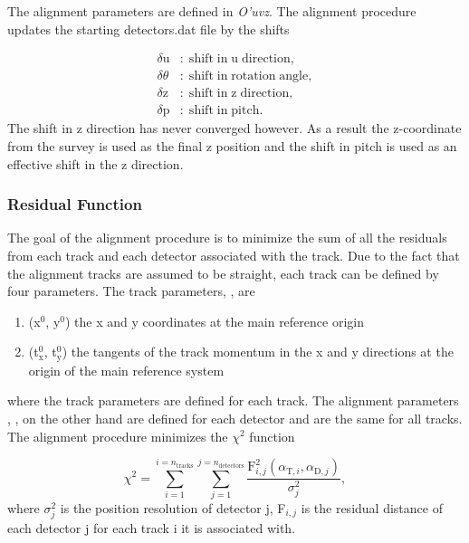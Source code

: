 The alignment parameters are defined in \textit{O'uvz}.  The alignment procedure
updates the starting detectors.dat file by the shifts

\begin{align}
  \delta \mathrm{u} & \mathrm{: \; shift \; in \; u \; direction,}  \\
  \delta \theta & \mathrm{: \; shift \; in \; rotation \; angle,}  \\
  \delta \mathrm{z} & \mathrm{: \; shift \; in \; z \; direction,}  \\
  \delta \mathrm{p} & \mathrm{: \; shift \; in \; pitch.} 
\end{align}
\noindent
The shift in z direction has never converged however.  As a result the
z-coordinate from the survey is used as the final z position and the shift in
pitch is used as an effective shift in the z direction.

\subsubsection{Residual Function}

The goal of the alignment procedure is to minimize the sum of all the residuals
from each track and each detector associated with the track.  Due to the fact
that the alignment tracks are assumed to be straight, each track can be defined
by four parameters.  The track parameters, {\atrack}, are

\begin{enumerate}[label=\roman*:]
\item (x$^0$, y$^0$) the x and y coordinates at the main reference origin
\item (t$_{\mathrm{x}}^0$, t$_{\mathrm{y}}^0$) the tangents of the track
  momentum in the x and y directions at the origin of the main reference system
\end{enumerate}
\noindent
where the track parameters are defined for each track.  The alignment parameters
, {\adet}, on the other hand are defined for each detector and are the same for
all tracks.  The alignment procedure minimizes the $\chi^2$ function

\begin{equation}
  \chi^2 =
  \sum_{i=1}^{i=n_{\mathrm{tracks}}}\sum_{j=1}^{j=n_{\mathrm{detectors}}}
  \frac{\mathrm{F}^2_{i,j}(\alpha_{\mathrm{T}, i}, \alpha_{\mathrm{D},
      j})}{\sigma_j^2},
  \label{equ::chi_align}%
\end{equation}
\noindent
where $\sigma^2_j$ is the position resolution of detector j, F$_{i,j}$ is the
residual distance of each detector j for each track i it is associated with.

